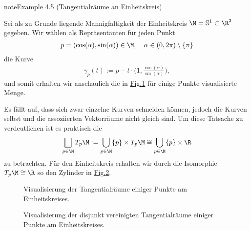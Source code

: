 \documentclass[letterpaper,10pt,english]{jupyterBook}
\let\sphinxpxdimen\pdfpxdimen\else\newdimen\sphinxpxdimen
\begin{document}
\begin{sphinxadmonition}{note}{Example 4.5 (Tangentialräume an Einheitskreis)}



\sphinxAtStartPar
Sei als zu Grunde liegende Mannigfaltigkeit der Einheitskreis \(\M = \mathbb{S}^1\subset\R^2\) gegeben.
Wir wählen als Repräsentanten für jeden Punkt
\begin{equation*}
\begin{split}p=(\cos(\alpha), \sin(\alpha))\in\M, \quad \alpha\in (0,2\pi) \setminus \{\pi\}\end{split}
\end{equation*}
\sphinxAtStartPar
die Kurve
\begin{equation*}
\begin{split}\gamma_p(t) := p - t \cdot\big(1, \frac{\cos(\alpha)}{\sin(\alpha)}\big),\end{split}
\end{equation*}
\sphinxAtStartPar
und somit erhalten wir anschaulich die in \hyperref[\detokenize{manifolds/tangential:fig-bundlea}]{Fig.\@ \ref{\detokenize{manifolds/tangential:fig-bundlea}}} für einige Punkte visualisierte Menge.

\sphinxAtStartPar
Es fällt auf, dass sich zwar einzelne Kurven schneiden können, jedoch die Kurven selbst und die assoziierten Vektorräume nicht gleich sind.
Um diese Tatsache zu verdeutlichen ist es praktisch die 
\begin{equation*}
\begin{split}\bigsqcup_{p\in\M} T_p\M := \bigcup_{p\in\M} \{p\} \times T_p\M \cong \bigcup_{p\in\M} \{p\} \times \R\end{split}
\end{equation*}
\sphinxAtStartPar
zu betrachten.
Für den Einheitskreis erhalten wir durch die Isomorphie \(T_p\M \cong \R\) so den Zylinder in \hyperref[\detokenize{manifolds/tangential:fig-bundleb}]{Fig.\@ \ref{\detokenize{manifolds/tangential:fig-bundleb}}}.
\end{sphinxadmonition}

\begin{figure}[htbp]
\centering
\capstart

\noindent\sphinxincludegraphics[height=300\sphinxpxdimen]{{bundlea}.jpg}
\caption{Visualisierung der Tangentialräume einiger Punkte am Einheitskreises.}\label{\detokenize{manifolds/tangential:fig-bundlea}}\end{figure}

\begin{figure}[htbp]
\centering
\capstart

\noindent\sphinxincludegraphics[height=300\sphinxpxdimen]{{bundleb}.jpg}
\caption{Visualisierung der disjunkt vereinigten Tangentialräume einiger Punkte am Einheitskreises.}\label{\detokenize{manifolds/tangential:fig-bundleb}}\end{figure}
\end{document}
